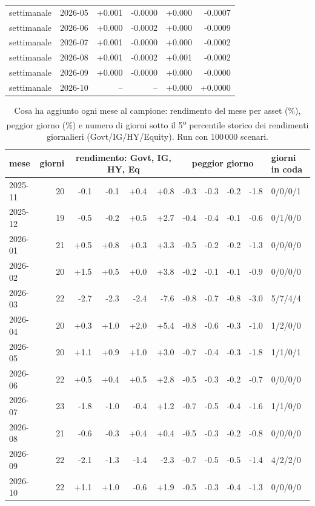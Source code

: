 \begin{table}[htbp]
\begin{tabular}{llrrrr}
settimanale & 2026-05 & +0.001 & -0.0000 & +0.000 & -0.0007 \\
settimanale & 2026-06 & +0.000 & -0.0002 & +0.000 & -0.0009 \\
settimanale & 2026-07 & +0.001 & -0.0000 & +0.000 & -0.0002 \\
settimanale & 2026-08 & +0.001 & -0.0002 & +0.001 & -0.0002 \\
settimanale & 2026-09 & +0.000 & -0.0000 & +0.000 & -0.0000 \\
settimanale & 2026-10 & -- & -- & +0.000 & +0.0000 \\
\bottomrule\end{tabular}\end{table}

\begin{table}[htbp]\centering\scriptsize\setlength{\tabcolsep}{3.5pt}
\caption{Cosa ha aggiunto ogni mese al campione: rendimento del mese per asset (\%), peggior giorno (\%) e numero di giorni sotto il 5\textsuperscript{o} percentile storico dei rendimenti giornalieri (Govt/IG/HY/Equity). Run con 100\,000 scenari.}\label{tab:added}
\begin{tabular}{lrrrrrrrrrl}\toprule
mese & giorni & \multicolumn{4}{c}{rendimento: Govt, IG, HY, Eq} & \multicolumn{4}{c}{peggior giorno} & giorni in coda \\\midrule
2025-11 & 20 & -0.1 & -0.1 & +0.4 & +0.8 & -0.3 & -0.3 & -0.2 & -1.8 & 0/0/0/1 \\
2025-12 & 19 & -0.5 & -0.2 & +0.5 & +2.7 & -0.4 & -0.4 & -0.1 & -0.6 & 0/1/0/0 \\
2026-01 & 21 & +0.5 & +0.8 & +0.3 & +3.3 & -0.5 & -0.2 & -0.2 & -1.3 & 0/0/0/0 \\
2026-02 & 20 & +1.5 & +0.5 & +0.0 & +3.8 & -0.2 & -0.1 & -0.1 & -0.9 & 0/0/0/0 \\
2026-03 & 22 & -2.7 & -2.3 & -2.4 & -7.6 & -0.8 & -0.7 & -0.8 & -3.0 & 5/7/4/4 \\
2026-04 & 20 & +0.3 & +1.0 & +2.0 & +5.4 & -0.8 & -0.6 & -0.3 & -1.0 & 1/2/0/0 \\
2026-05 & 20 & +1.1 & +0.9 & +1.0 & +3.0 & -0.7 & -0.4 & -0.3 & -1.8 & 1/1/0/1 \\
2026-06 & 22 & +0.5 & +0.4 & +0.5 & +2.8 & -0.5 & -0.3 & -0.2 & -0.7 & 0/0/0/0 \\
2026-07 & 23 & -1.8 & -1.0 & -0.4 & +1.2 & -0.7 & -0.5 & -0.4 & -1.6 & 1/1/0/0 \\
2026-08 & 21 & -0.6 & -0.3 & +0.4 & +0.4 & -0.5 & -0.3 & -0.2 & -0.8 & 0/0/0/0 \\
2026-09 & 22 & -2.1 & -1.3 & -1.4 & -2.3 & -0.7 & -0.5 & -0.5 & -1.4 & 4/2/2/0 \\
2026-10 & 22 & +1.1 & +1.0 & -0.6 & +1.9 & -0.5 & -0.3 & -0.4 & -1.3 & 0/0/0/0 \\
\bottomrule\end{tabular}\end{table}

